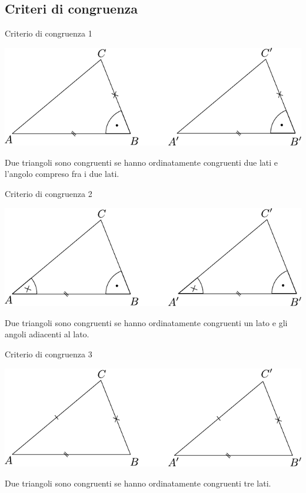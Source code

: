 \subsection{Criteri di congruenza}
\begin{teorema}{Criterio di congruenza 1}
	\begin{center}
		\includegraphics{Images/Cong 1.pdf }
	\end{center}
	Due triangoli sono congruenti se hanno ordinatamente congruenti due lati e l’angolo compreso fra i due lati.
\end{teorema}
\begin{teorema}{Criterio di congruenza 2}
	\begin{center}
		\includegraphics{Images/Cong 2.pdf }
	\end{center}
	Due triangoli sono congruenti se hanno ordinatamente congruenti un lato e gli angoli adiacenti al lato.
\end{teorema}
\begin{teorema}{Criterio di congruenza 3}
	\begin{center}
		\includegraphics{Images/Cong 3.pdf }
	\end{center}
	Due triangoli sono congruenti se hanno ordinatamente congruenti tre lati.
\end{teorema}

